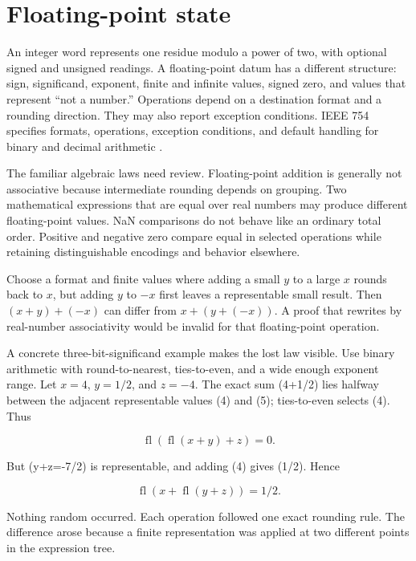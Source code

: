 \section{Floating-point state}

An integer word represents one residue modulo a power of two, with optional
signed and unsigned readings. A floating-point datum has a different
structure: sign, significand, exponent, finite and infinite values, signed
zero, and values that represent ``not a number.'' Operations depend on a
destination format and a rounding direction. They may also report exception
conditions. IEEE 754 specifies formats, operations, exception conditions, and
default handling for binary and decimal arithmetic
\autocite{ieee7542019}.

The familiar algebraic laws need review. Floating-point addition is generally
not associative because intermediate rounding depends on grouping. Two
mathematical expressions that are equal over real numbers may produce
different floating-point values. NaN comparisons do not behave like an
ordinary total order. Positive and negative zero compare equal in selected
operations while retaining distinguishable encodings and behavior elsewhere.

\begin{example}[title={A regrouping can change a result}]
Choose a format and finite values where adding a small \(y\) to a large \(x\)
rounds back to \(x\), but adding \(y\) to \(-x\) first leaves a representable
small result. Then \((x+y)+(-x)\) can differ from
\(x+(y+(-x))\). A proof that rewrites by real-number associativity would be
invalid for that floating-point operation.
\end{example}

A concrete three-bit-significand example makes the lost law visible. Use
binary arithmetic with round-to-nearest, ties-to-even, and a wide enough
exponent range. Let \(x=4\), \(y=1/2\), and \(z=-4\). The exact sum
(4+1/2) lies halfway between the adjacent representable values (4) and
(5); ties-to-even selects (4). Thus

\[
  \mathop{\mathrm{fl}}(\mathop{\mathrm{fl}}(x+y)+z)=0.
\]

But (y+z=-7/2) is representable, and adding (4) gives (1/2). Hence

\[
  \mathop{\mathrm{fl}}(x+\mathop{\mathrm{fl}}(y+z))=1/2.
\]

Nothing random occurred. Each operation followed one exact rounding rule.
The difference arose because a finite representation was applied at two
different points in the expression tree.

